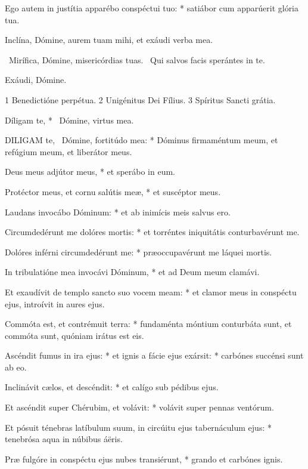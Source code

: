 Ego autem in justítia apparébo conspéctui tuo: * satiábor cum apparúerit glória tua.

 Inclína, Dómine, aurem tuam mihi, et exáudi verba mea.


\V\ Mirífica, Dómine, misericórdias tuas. \R\ Qui salvos facis sperántes in te.

 Exáudi, Dómine.

 1 Benedictióne perpétua. 2 Unigénitus Dei Fílius. 3 Spíritus Sancti grátia.


 Díligam te, * \textdagger\ Dómine, virtus mea.


\lettrine[lines=2]{D}{ILIGAM} te, \textdagger\ Dómine, fortitúdo mea: * Dóminus firmaméntum meum, et refúgium meum, et liberátor meus.

Deus meus adjútor meus, * et sperábo in eum.

Protéctor meus, et cornu salútis meæ, * et suscéptor meus.

Laudans invocábo Dóminum: * et ab inimícis meis salvus ero.

Circumdedérunt me dolóres mortis: * et torréntes iniquitátis conturbavérunt me.

Dolóres inférni circumdedérunt me: * præoccupavérunt me láquei mortis.

In tribulatióne mea invocávi Dóminum, * et ad Deum meum clamávi.

Et exaudívit de templo sancto suo vocem meam: * et clamor meus in conspéctu ejus, introívit in aures ejus.

Commóta est, et contrémuit terra: * fundaménta móntium conturbáta sunt, et commóta sunt, quóniam irátus est eis.

Ascéndit fumus in ira ejus: * et ignis a fácie ejus exársit: * carbónes succénsi sunt ab eo.

Inclinávit cælos, et descéndit: * et calígo sub pédibus ejus.

Et ascéndit super Chérubim, et volávit: * volávit super pennas ventórum.

Et pósuit ténebras latíbulum suum, in circúitu ejus tabernáculum ejus: * tenebrósa aqua in núbibus áëris.

Præ fulgóre in conspéctu ejus nubes transiérunt, * grando et carbónes ignis.

